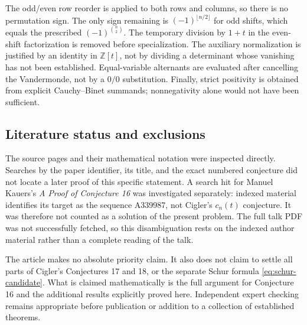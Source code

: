 \documentclass[11pt]{article}
\theoremstyle{definition}
\theoremstyle{remark}
\newcommand{\Z}{\mathbb Z}
\theoremstyle{definition}
\theoremstyle{plain}
\numberwithin{equation}{section}
\begin{document}
The odd/even row reorder is applied to both rows and columns, so there is
no permutation sign. The only sign remaining is $(-1)^{\lfloor n/2\rfloor}$
for odd shifts, which equals the prescribed $(-1)^{\binom n2}$.
The temporary division by $1+t$ in the even-shift factorization is removed
before specialization. The auxiliary normalization is justified by an
identity in $\Z[t]$, not by dividing a determinant whose vanishing has
not been established. Equal-variable alternants are evaluated after
cancelling the Vandermonde, not by a $0/0$ substitution. Finally,
strict positivity is obtained from explicit Cauchy--Binet summands;
nonnegativity alone would not have been sufficient.

\subsection{Literature status and exclusions}
The source pages and their mathematical notation were inspected directly.
Searches by the paper identifier, its title, and the exact numbered
conjecture did not locate a later proof of this specific statement.
A search hit for Manuel Kauers's \emph{A Proof of Conjecture 16} \cite{KauersIndex} was
investigated separately: indexed material identifies its target as the
sequence A339987, not Cigler's $c_n(t)$ conjecture. It was therefore not
counted as a solution of the present problem. The full talk PDF was not
successfully fetched, so this disambiguation rests on the indexed author
material rather than a complete reading of the talk.

The article makes no absolute priority claim. It also does not claim to
settle all parts of Cigler's Conjectures 17 and 18, or the separate Schur
formula \eqref{eq:schur-candidate}. What is claimed mathematically is the
full argument for Conjecture 16 and the additional results explicitly
proved here. Independent expert checking remains appropriate before
publication or addition to a collection of established theorems.


\end{document}
